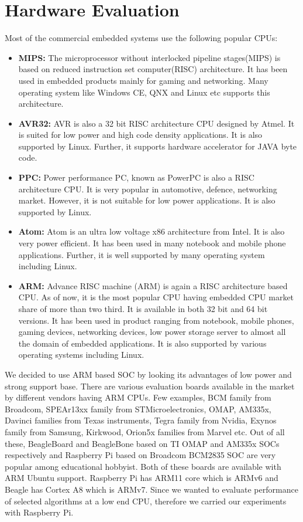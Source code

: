 \section {Hardware Evaluation}
\indent Most of the commercial embedded systems use the following
popular CPUs:
\begin{itemize}
 \item \textbf{MIPS:} The microprocessor without interlocked
 pipeline stages(MIPS) is based on reduced instruction
 set computer(RISC) architecture. It has been used in
 embedded products mainly for gaming and networking. Many
 operating system like Windows CE, QNX and Linux etc
 supports this architecture.
 \item \textbf{AVR32:} AVR is also a 32 bit RISC architecture CPU
 designed by Atmel. It is suited for low power and high
 code density applications. It is also supported by
 Linux. Further, it supports hardware accelerator for
 JAVA byte code.
 \item \textbf{PPC:} Power performance PC, known as PowerPC is
 also a RISC architecture CPU. It is very popular in
 automotive, defence, networking market. However, it is not
 suitable for low power applications. It is also
 supported by Linux.
 \item \textbf{Atom:} Atom is an ultra low voltage x86
 architecture from Intel. It is also very power
 efficient. It has been used in many notebook and mobile
 phone applications. Further, it is well supported by many
 operating system including Linux.
 \item \textbf{ARM:} Advance RISC machine (ARM) is again a RISC
 architecture based CPU. As of now, it is the most
 popular CPU having embedded CPU market share of more
 than two third. It is available in both 32 bit and 64
 bit versions. It has been used in product ranging from
 notebook, mobile phones, gaming devices, networking
 devices, low power storage server to almost all the
 domain of embedded applications. It is also supported by
 various operating systems including Linux.
\end{itemize}
We decided to use ARM based SOC by looking its advantages of low power
and strong support base. There are various evaluation boards available
in the market by different vendors having ARM CPUs. Few examples, BCM
family from Broadcom, SPEAr13xx family from STMicroelectronics, OMAP,
AM335x, Davinci families from Texas instruments, Tegra family from
Nvidia, Exynos family from Samsung, Kirkwood, Orion5x families from
Marvel etc. Out of all these, BeagleBoard and BeagleBone based on TI
OMAP and AM335x SOCs respectively and Raspberry Pi based on Broadcom
BCM2835 SOC are very popular among educational hobbyist. Both of these
boards are available with ARM Ubuntu support. Raspberry Pi has ARM11
core which is ARMv6 and Beagle has Cortex A8 which is ARMv7. Since we
wanted to evaluate performance of selected algorithms at a low end CPU,
therefore we carried our experiments with Raspberry Pi.
